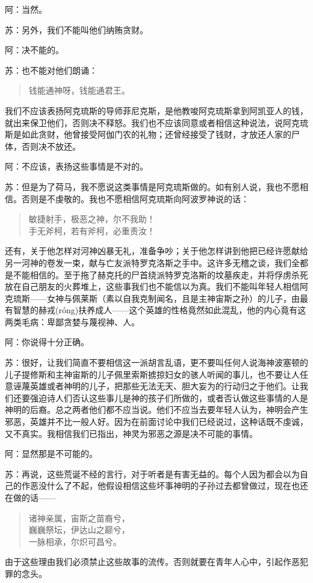 \documentclass[11pt,oneside]{book}
\begin{document}
\begin{common-format}
阿：当然。

苏：另外，我们不能叫他们纳贿贪财。

阿：决不能的。

苏：也不能对他们朗诵：
\begin{verse}
钱能通神呀，钱能通君王。
\end{verse}
我们不应该表扬阿克琉斯的导师菲尼克斯，是他教唆阿克琉斯拿到阿凯亚人的钱，就出来保卫他们，否则决不释怒。我们也不应该同意或者相信这种说法，说阿克琉斯是如此贪财，他曾接受阿伽门农的礼物；还曾经接受了钱财，才放还人家的尸体，否则决不放还。

阿：不应该，表扬这些事情是不对的。

苏：但是为了荷马，我不愿说这类事情是阿克琉斯做的。如有别人说，我也不愿相信。否则是不虔敬的。我也不愿相信阿克琉斯向阿波罗神说的话：
\begin{verse}
敏捷射手，极恶之神，尔不我助！\\
手无斧柯，若有斧柯，必重责汝！
\end{verse}
还有，关于他怎样对河神凶暴无礼，准备争吵；关于他怎样讲到他把已经许愿献给另一河神的卷发一束，献与亡友派特罗克洛斯之手中。这许多无稽之谈，我们全都是不能相信的。至于拖了赫克托的尸首绕派特罗克洛斯的坟墓疾走，并将俘虏杀死放在自己朋友的火葬堆上，这些事我们也不能信以为真。我们不能叫年轻人相信阿克琉斯——女神与佩莱斯（素以自我克制闻名，且是主神宙斯之孙）的儿子，由最有智慧的赫戎(róng)扶养成人——这个英雄的性格竟然如此混乱，他的内心竟有这两类毛病：卑鄙贪婪与蔑视神、人。

阿：你说得十分正确。

苏：很好，让我们简直不要相信这一派胡言乱语，更不要叫任何人说海神波塞顿的儿子提修斯和主神宙斯的儿子佩里索斯掳掠妇女的骇人听闻的事儿，也不要让人任意诬蔑英雄或者神明的儿子，把那些无法无天、胆大妄为的行动归之于他们。让我们还要强迫诗人们否认这些事儿是神的孩子们所做的，或者否认做这些事情的人是神明的后裔。总之两者他们都不应当说。他们不应当去要年轻人认为，神明会产生邪恶，英雄并不比一般人好。因为在前面讨论中我们已经说过，这种话既不虔诚，又不真实。我相信我们已指出，神灵为邪恶之源是决不可能的事情。

阿：显然那是不可能的。

苏：再说，这些荒诞不经的言行，对于听者是有害无益的。每个人因为都会以为自己的作恶没什么了不起，他假设相信这些坏事神明的子孙过去都曾做过，现在也还在做的话——
\begin{verse}
诸神亲属，宙斯之苗裔兮，\\
巍巍祭坛，伊达山之巅兮，\\
一脉相承，尔炽可昌兮。
\end{verse}
由于这些理由我们必须禁止这些故事的流传。否则就要在青年人心中，引起作恶犯罪的念头。


\end{common-format}
\end{document}
